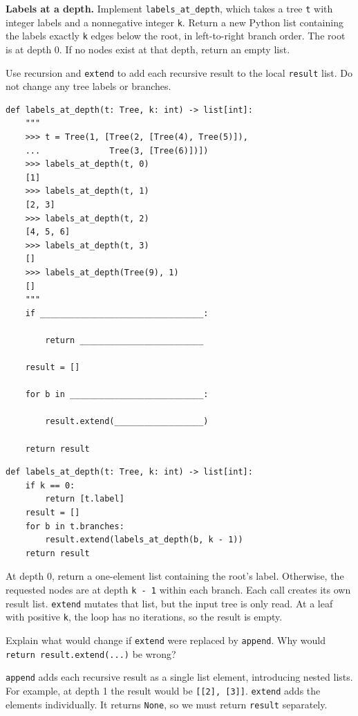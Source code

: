 \begin{blocksection}
\question \textbf{Labels at a depth.} Implement \lstinline{labels_at_depth},
which takes a tree \lstinline{t} with integer labels and a nonnegative integer
\lstinline{k}. Return a new Python list containing the labels exactly
\lstinline{k} edges below the root, in left-to-right branch order. The root is
at depth 0. If no nodes exist at that depth, return an empty list.

Use recursion and \lstinline{extend} to add each recursive result to the local
\lstinline{result} list. Do not change any tree labels or branches.

\begin{lstlisting}
def labels_at_depth(t: Tree, k: int) -> list[int]:
    """
    >>> t = Tree(1, [Tree(2, [Tree(4), Tree(5)]),
    ...              Tree(3, [Tree(6)])])
    >>> labels_at_depth(t, 0)
    [1]
    >>> labels_at_depth(t, 1)
    [2, 3]
    >>> labels_at_depth(t, 2)
    [4, 5, 6]
    >>> labels_at_depth(t, 3)
    []
    >>> labels_at_depth(Tree(9), 1)
    []
    """
    if _________________________________:

        return _________________________

    result = []

    for b in ___________________________:

        result.extend(__________________)

    return result
\end{lstlisting}
\end{blocksection}

\begin{solution}
\begin{lstlisting}
def labels_at_depth(t: Tree, k: int) -> list[int]:
    if k == 0:
        return [t.label]
    result = []
    for b in t.branches:
        result.extend(labels_at_depth(b, k - 1))
    return result
\end{lstlisting}
At depth 0, return a one-element list containing the root's label. Otherwise,
the requested nodes are at depth \lstinline{k - 1} within each branch.
Each call creates its own result list. \lstinline{extend} mutates that list,
but the input tree is only read. At a leaf with positive \lstinline{k}, the
loop has no iterations, so the result is empty.
\end{solution}

\begin{blocksection}
Explain what would change if \lstinline{extend} were replaced by
\lstinline{append}. Why would \lstinline{return result.extend(...)} be wrong?
\begin{solution}[.65in]
\lstinline{append} adds each recursive result as a single list element,
introducing nested lists. For example, at depth 1 the result would be
\lstinline{[[2], [3]]}. \lstinline{extend} adds the elements individually.
It returns \lstinline{None}, so we must return \lstinline{result} separately.
\end{solution}
\end{blocksection}

